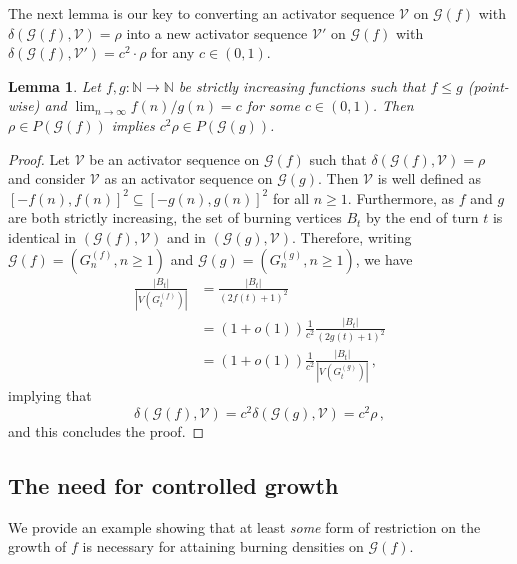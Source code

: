 \documentclass[12pt]{article}
\newtheorem{lemma}[theorem]{Lemma}
\theoremstyle{remark}
\providecommand{\N}{}
\renewcommand{\N}{{\mathbb N}}
\newcommand\cG{\mathcal G}
\newcommand\cV{\mathcal V}
\begin{document}
The next lemma is our key to converting an activator sequence $\cV$ on $\cG(f)$ with $\delta(\cG(f),\cV) = \rho$ into a new activator sequence $\cV'$ on $\cG(f)$ with $\delta(\cG(f),\cV') = c^2 \cdot \rho$ for any $c \in (0,1)$.

\begin{lemma} \label{lem:f,g frac density}
Let $f,g : \N \to \N$ be strictly increasing functions such that $f \leq g$ (point-wise) and $\lim_{n\to \infty} f(n)/g(n) = c$ for some $c \in (0,1)$. Then $\rho \in P(\cG(f))$ implies $c^2 \rho \in P(\cG(g))$. 
\end{lemma}

\begin{proof}
Let $\cV$ be an activator sequence on $\cG(f)$ such that $\delta(\cG(f),\cV) = \rho$ and consider $\cV$ as an activator sequence on $\cG(g)$. Then $\cV$ is well defined as $[-f(n),f(n)]^2 \subseteq [-g(n),g(n)]^2$ for all $n \geq 1$. Furthermore, as $f$ and $g$ are both strictly increasing, the set of burning vertices $B_t$ by the end of turn $t$ is identical in $(\cG(f),\cV)$ and in $(\cG(g),\cV)$. Therefore, writing $\cG(f) = (G^{(f)}_n,n \geq 1)$ and $\cG(g) = (G^{(g)}_n,n \geq 1)$, we have 
\begin{align*}
\frac{|B_t|}{|V(G^{(f)}_t)|}
&=
\frac{|B_t|}{(2f(t)+1)^2}\\
&=
(1+o(1)) \frac{1}{c^2} \frac{|B_t|}{(2g(t)+1)^2}\\
&=
(1+o(1)) \frac{1}{c^2} \frac{|B_t|}{|V(G^{(g)}_t)|} \,,
\end{align*}
implying that 
\[
\delta(\cG(f),\cV) = c^2 \delta(\cG(g),\cV) = c^2 \rho \,,
\]
and this concludes the proof. 
\end{proof}

\subsection{The need for controlled growth}\label{sec:aux4}

We provide an example showing that at least \emph{some} form of restriction on the growth of $f$ is necessary for attaining burning densities on $\cG(f)$.
\end{document}
